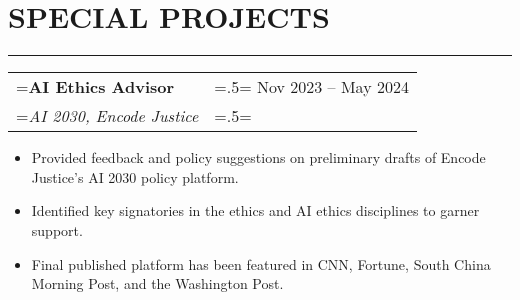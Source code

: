 \documentclass{article}
\begin{document}



\section*{\normalsize{SPECIAL PROJECTS}}
\vspace{-1.8em}
\noindent\rule{\textwidth}{.5pt}

\vspace{.5em}

\hspace{-1em}
\begin{tabularx}{\textwidth}{
    >{\raggedright\arraybackslash\hsize=1.5\hsize\linewidth=\hsize}X
    >{\raggedleft\arraybackslash\hsize=.5\hsize\linewidth=\hsize}X }
    \textbf{AI Ethics Advisor} & Nov 2023 -- May 2024\\
    \textit{AI 2030, Encode Justice} & \\
\end{tabularx}
\vspace{-.5em}
\begin{itemize}[label={--}, leftmargin=1em]
    \setlength\itemsep{0em}
    \item Provided feedback and policy suggestions on preliminary drafts of Encode Justice's AI 2030 policy platform.
    \item Identified key signatories in the ethics and AI ethics disciplines to garner support.
    \item Final published platform has been featured in CNN, Fortune, South China Morning Post, and the Washington Post.
\end{itemize}
\end{document}
